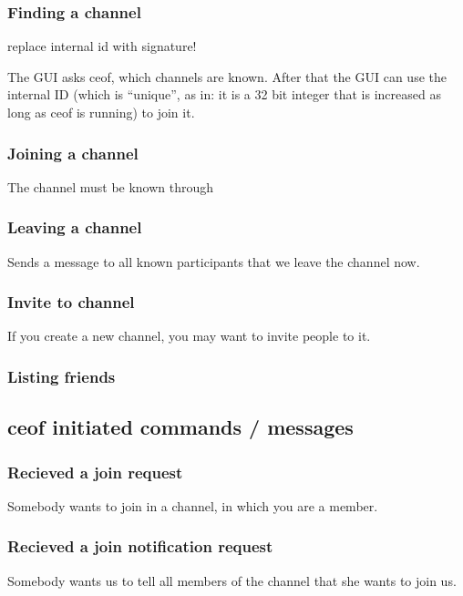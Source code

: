 \documentclass[12pt,a4paper]{article}
\begin{document}
\subsubsection{Finding a channel}
replace internal id with signature!

The GUI asks ceof, which channels are known. After that the GUI
can use the internal ID (which is "`unique"', as in: it is a 32 bit integer
that is increased as long as ceof is running) to join it.
\subsubsection{Joining a channel}
The channel must be known through 
\subsubsection{Leaving a channel}
Sends a message to all known participants that we leave the channel now.
\subsubsection{Invite to channel}
If you create a new channel, you may want to invite people to it.
\subsubsection{Listing friends}
\subsection{ceof initiated commands / messages}
\subsubsection{Recieved a join request}
Somebody wants to join in a channel, in which you are a member.
\subsubsection{Recieved a join notification request}
Somebody wants us to tell all members of the channel that she wants to join us.
\end{document}
